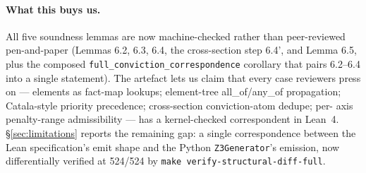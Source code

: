 \paragraph{What this buys us.}
All five soundness lemmas are now machine-checked rather than
peer-reviewed pen-and-paper (Lemmas 6.2, 6.3, 6.4, the
cross-section step 6.4', and Lemma 6.5, plus the composed
\texttt{full\_conviction\_correspondence} corollary that pairs
6.2--6.4 into a single statement). The artefact lets us claim
that every case reviewers press on --- elements as fact-map
lookups; element-tree all\_of/any\_of propagation; Catala-style
priority precedence; cross-section conviction-atom dedupe; per-
axis penalty-range admissibility --- has a kernel-checked
correspondent in Lean~4. \S\ref{sec:limitations} reports the remaining gap: a single
correspondence between the Lean specification's emit shape and
the Python \texttt{Z3Generator}'s emission, now differentially
verified at 524/524 by
\texttt{make verify-structural-diff-full}.
